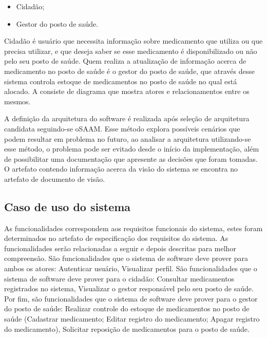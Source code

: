 \begin{itemize}
    \item Cidadão;
    \item Gestor do posto de saúde.
\end{itemize}

Cidadão é usuário que necessita informação sobre medicamento que utiliza ou que precisa utilizar, e que deseja saber se esse medicamento é disponibilizado ou não pelo seu posto de saúde. Quem realiza a atualização de informação acerca de medicamento no posto de saúde é o gestor do posto de saúde, que através desse sistema controla estoque de medicamentos no posto de saúde no qual está alocado. A  consiste de diagrama que mostra atores e relacionamentos entre os mesmos.

%

A definição da arquitetura do software é realizada após seleção de arquitetura candidata seguindo-se o\acrfull{SAAM}. Esse método explora possíveis cenários que podem resultar em problema no futuro, ao analisar a arquitetura utilizando-se esse método, o problema pode ser evitado desde o início da implementação, além de possibilitar uma documentação que apresente as decisões que foram tomadas. O artefato contendo informação acerca da visão do sistema se encontra no artefato de documento de visão.

\subsection{Caso de uso do sistema}

As funcionalidades correspondem aos requisitos funcionais do sistema, estes foram determinados no artefato de especificação dos requisitos do sistema. As funcionalidades serão relacionadas a seguir e depois descritas para melhor compreensão. São funcionalidades que o sistema de software deve prover para ambos os atores: Autenticar usuário, Visualizar perfil. São  funcionalidades que o sistema de software deve prover para o cidadão: Consultar medicamentos registrados no sistema, Visualizar o gestor responsável pelo seu posto de saúde. Por fim, são  funcionalidades que o sistema de software deve prover para o gestor do posto de saúde: Realizar controle do estoque de medicamentos no posto de saúde (Cadastrar medicamento; Editar registro do medicamento; Apagar registro do medicamento), Solicitar reposição de medicamentos para o posto de saúde.

